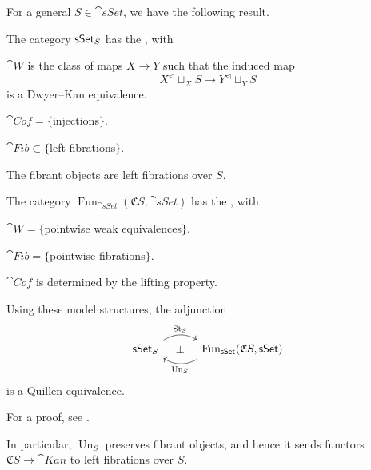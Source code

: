 For a general $S\in\cat{sSet}$, we have the following result.

\begin{theorem}\label{thm-5-g}
    The category $\mathsf{sSet}_{\/S}$ has the , with
    \begin{itms}
        \item $\cat{W}$ is the class of maps $X\to Y$ such that the induced map 
        \[ X^\vartriangleleft\mathop{\sqcup}_XS\to Y^\vartriangleleft\mathop{\sqcup}_YS \]
        is a Dwyer--Kan equivalence.
        \item $\cat{Cof}=\{$injections$\}$.
        \item $\cat{Fib}\subset\{$left fibrations$\}$.
        \item The fibrant objects are left fibrations over $S$.
    \end{itms}
    The category $\operatorname{Fun}_{\cat{sSet}}(\mathfrak CS,\cat{sSet})$
    has the , with
    \begin{itms}
        \item $\cat W=\{$pointwise weak equivalences$\}$.
        \item $\cat{Fib}=\{$pointwise fibrations$\}$.
        \item $\cat{Cof}$ is determined by the lifting property.
    \end{itms}
    Using these model structures, the adjunction
    \[\begin{tikzcd}[column sep=3em]
        \cat{sSet}_{\/S}\ar[r,bend left,start anchor=north east,end anchor=north west,"\operatorname{St}_S"]
        \ar[r,phantom,"\bot"] &
        \operatorname{Fun}_{\cat{sSet}}(\mathfrak CS,\cat{sSet})
        \ar[l,bend left,start anchor=south west,end anchor=south east,"\operatorname{Un}_S"]
    \end{tikzcd}\]
    is a Quillen equivalence.
\end{theorem}

For a proof, see \cite[Theorem~2.2.1.2]{htt}.

In particular, $\operatorname{Un}_S$ preserves fibrant objects,
and hence it sends functors $\mathfrak CS\to\cat{Kan}$
to left fibrations over $S$.

